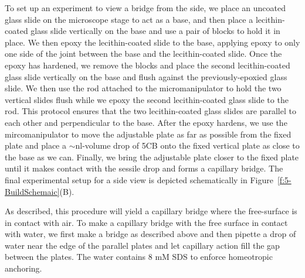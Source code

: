 To set up an experiment to view a bridge from the side, we place an uncoated glass slide on the microscope stage to act as a base, and then place a lecithin-coated glass slide vertically on the base and use a pair of blocks to hold it in place.
We then epoxy the lecithin-coated slide to the base, applying epoxy to only one side of the joint between the base and the lecithin-coated slide.
Once the epoxy has hardened, we remove the blocks and place the second lecithin-coated glass slide vertically on the base and flush against the previously-epoxied glass slide.
We then use the rod attached to the micromanipulator to hold the two vertical slides flush while we epoxy the second lecithin-coated glass slide to the rod.
This protocol ensures that the two lecithin-coated glass slides are parallel to each other and perpendicular to the base.
After the epoxy hardens, we use the mircomanipulator to move the adjustable plate as far as possible from the fixed plate and place a $\sim$nl-volume drop of 5CB onto the fixed vertical plate as close to the base as we can.
Finally, we bring the adjustable plate closer to the fixed plate until it makes contact with the sessile drop and forms a capillary bridge.
The final experimental setup for a side view is depicted schematically in Figure~\ref{f:5-BuildSchemaic}(B).

As described, this procedure will yield a capillary bridge where the free-surface is in contact with air.
To make a capillary bridge with the free surface in contact with water, we first make a bridge as described above and then pipette a drop of water near the edge of the parallel plates and let capillary action fill the gap between the plates.
The water contains 8 mM SDS to enforce homeotropic anchoring.




